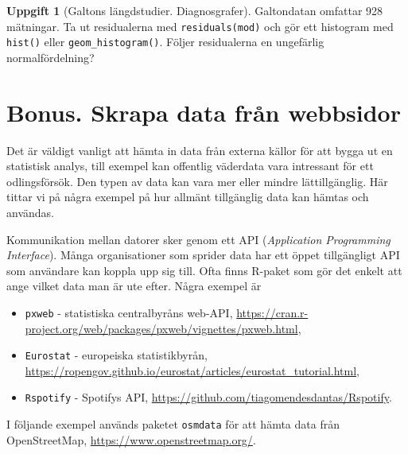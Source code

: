 \documentclass[
]{book}
\providecommand{\tightlist}{%
  \setlength{\itemsep}{0pt}\setlength{\parskip}{0pt}}
\theoremstyle{definition}
\theoremstyle{definition}
\theoremstyle{definition}
\newtheorem{exercise}{Uppgift}[chapter]
\theoremstyle{definition}
\theoremstyle{remark}
\begin{document}
\begin{exercise}[Galtons längdstudier. Diagnosgrafer]
Galtondatan omfattar 928 mätningar. Ta ut residualerna med \texttt{residuals(mod)} och gör ett histogram med \texttt{hist()} eller \texttt{geom\_histogram()}. Följer residualerna en ungefärlig normalfördelning?
\end{exercise}

\section{Bonus. Skrapa data från webbsidor}\label{bonus.-skrapa-data-fruxe5n-webbsidor}

Det är väldigt vanligt att hämta in data från externa källor för att bygga ut en statistisk analys, till exempel kan offentlig väderdata vara intressant för ett odlingsförsök. Den typen av data kan vara mer eller mindre lättillgänglig. Här tittar vi på några exempel på hur allmänt tillgänglig data kan hämtas och användas.

Kommunikation mellan datorer sker genom ett API (\emph{Application Programming Interface}). Många organisationer som sprider data har ett öppet tillgängligt API som användare kan koppla upp sig till. Ofta finns R-paket som gör det enkelt att ange vilket data man är ute efter. Några exempel är

\begin{itemize}
\tightlist
\item
  \texttt{pxweb} - statistiska centralbyråns web-API, \url{https://cran.r-project.org/web/packages/pxweb/vignettes/pxweb.html},
\item
  \texttt{Eurostat} - europeiska statistikbyrån, \url{https://ropengov.github.io/eurostat/articles/eurostat_tutorial.html},
\item
  \texttt{Rspotify} - Spotifys API, \url{https://github.com/tiagomendesdantas/Rspotify}.
\end{itemize}

I följande exempel används paketet \texttt{osmdata} för att hämta data från OpenStreetMap, \url{https://www.openstreetmap.org/}.
\end{document}
